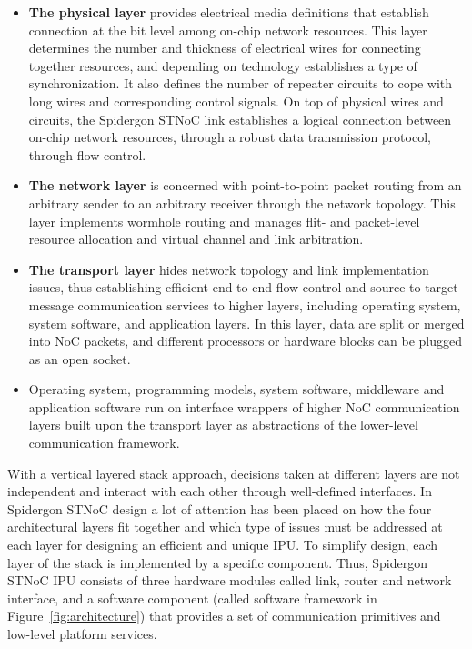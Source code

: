\begin{itemize}
\item 
\textbf{The physical layer} provides electrical media definitions that establish connection at the bit level among on-chip network resources. 
This layer determines the number and thickness of electrical wires for connecting together resources, and depending on technology establishes a type of synchronization. 
It also defines the number of repeater circuits to cope with long wires and corresponding control signals. 
On top of physical wires and circuits, the Spidergon STNoC link establishes a logical connection between on-chip network resources, through a robust data transmission protocol, through flow control.

\item 
\textbf{The network layer} is concerned with point-to-point packet routing from an arbitrary sender to an arbitrary receiver through the network topology. 
This layer implements wormhole routing and manages flit- and packet-level resource allocation and virtual channel and link arbitration.

\item 
\textbf{The transport layer} hides network topology and link implementation issues, thus establishing efficient end-to-end flow control and source-to-target message communication services to higher layers, including operating system, system software, and application layers. 
In this layer, data are split or merged into NoC packets, and different processors or hardware blocks can be plugged as an open socket.

\item 
Operating system, programming models, system software, middleware and application software run on interface wrappers of higher NoC communication layers built upon the transport layer as abstractions of the lower-level communication framework. 

\end{itemize}

With a vertical layered stack approach, decisions taken at different layers are not independent and interact with each other through well-defined interfaces. 
In Spidergon STNoC design a lot of attention has been placed on how the four architectural layers fit together and which type of issues must be addressed at each layer for designing an efficient and unique IPU. 
To simplify design, each layer of the stack is implemented by a specific component. 
Thus, Spidergon STNoC IPU consists of three hardware modules called link, router and network interface, and a software component (called software framework in Figure~\ref{fig:architecture}) that provides a set of communication primitives and low-level platform services.

